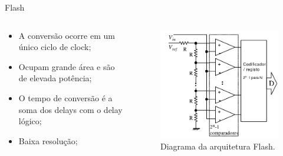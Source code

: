 \documentclass{beamer}
\begin{document}
\begin{frame}{Flash}
\begin{columns}
    \begin{column}{0.50\textwidth}
		\begin{itemize}
			\item A conversão ocorre em um único ciclo de clock;
			\item Ocupam grande área e são de elevada potência;
			\item O tempo de conversão é a soma dos delays com o delay lógico;
			\item Baixa resolução;
		\end{itemize}
    \end{column}

    \begin{column}{0.5\textwidth}
		\begin{figure}[H]
		    \centering
		    \begin{center}
		    \includegraphics[width=\textwidth]{img/flash}
		  \caption{Diagrama da arquitetura Flash.}
		    \label{fig:sar}
		  \end{center}
		\end{figure}
    \end{column}
\end{columns}
\end{frame}

\end{document}
